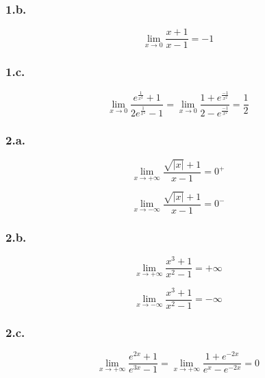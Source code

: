 \documentclass{report}
\begin{document}
\subsubsection*{1.b.}
\begin{displaymath}
	\lim_{x \rightarrow 0} \frac{x+1}{x-1} = -1
\end{displaymath}

\subsubsection*{1.c.}
\begin{displaymath}
		\lim_{x \rightarrow 0} \frac{e^{\frac{1}{x^2}}+1}{2e^{\frac{1}{x^2}}-1}
		        = \lim_{x \rightarrow 0} \frac{1 + e^{\frac{-1}{x^2}}}{2-e^{\frac{-1}{x^2}}} = \frac{1}{2}
\end{displaymath}

\subsubsection*{2.a.}
\begin{displaymath}
	\lim_{x \rightarrow +\infty} \frac{\sqrt{|x|}+1}{x-1} = 0^{+}
\end{displaymath}

\begin{displaymath}
	\lim_{x \rightarrow -\infty} \frac{\sqrt{|x|}+1}{x-1} = 0^{-}
\end{displaymath}

\subsubsection*{2.b.}
\begin{displaymath}
	\lim_{x \rightarrow +\infty} \frac{x^3+1}{x^2-1} = +\infty
\end{displaymath}

\begin{displaymath}
	\lim_{x \rightarrow -\infty} \frac{x^3+1}{x^2-1} = -\infty
\end{displaymath}

\subsubsection*{2.c.}
\begin{displaymath}
	\lim_{x \rightarrow +\infty} \frac{e^{2x}+1}{e^{3x}-1} = \lim_{x \rightarrow +\infty} \frac{1+ e^{-2x}}{e^{x}-e^{-2x}} = 0
\end{displaymath}
\end{document}
